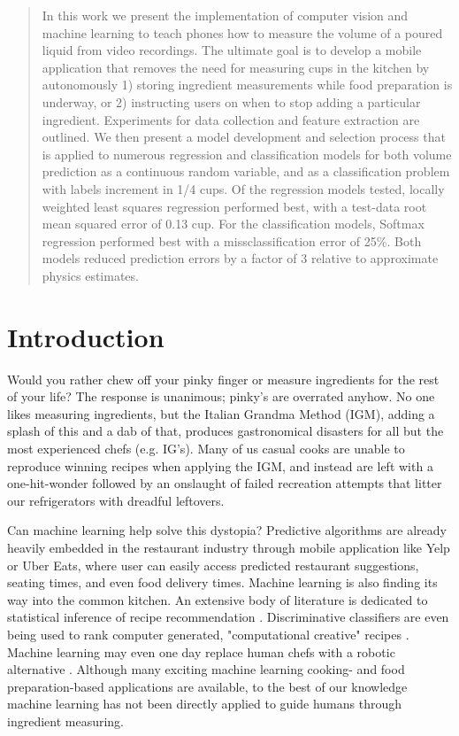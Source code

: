 \documentclass[twocolumn,10pt]{article}
\begin{document}

\begin{abstract}
In this work we present the implementation of computer vision and machine learning to teach phones how to measure the volume of a poured liquid from video recordings. The ultimate goal is to develop a mobile application that removes the need for measuring cups in the kitchen by autonomously 1) storing ingredient measurements while food preparation is underway, or 2) instructing users on when to stop adding a particular ingredient. Experiments for data collection and feature extraction are outlined. We then present a model development and selection process that is applied to numerous regression and classification models for both volume prediction as a continuous random variable, and as a classification problem with labels increment in 1/4 cups. Of the regression models tested, locally weighted least squares regression performed best, with a test-data root mean squared error of 0.13 cup. For the classification models, Softmax regression performed best with a missclassification error of 25\%. Both models reduced prediction errors by a factor of 3 relative to approximate physics estimates.        
\end{abstract}

\section{Introduction}
Would you rather chew off your pinky finger or measure ingredients for the rest of your life? The response is unanimous; pinky's are overrated anyhow. No one likes measuring ingredients, but the Italian Grandma Method (IGM), adding a splash of this and a dab of that, produces gastronomical disasters for all but the most experienced chefs (e.g. IG’s). Many of us casual cooks are unable to reproduce winning recipes when applying the IGM, and instead are left with a one-hit-wonder followed by an onslaught of failed recreation attempts that litter our refrigerators with dreadful leftovers.

Can machine learning help solve this dystopia? Predictive algorithms are already heavily embedded in the restaurant industry through mobile application like Yelp or Uber Eats, where user can easily access predicted restaurant suggestions, seating times, and even food delivery times. Machine learning is also finding its way into the common kitchen. An extensive body of literature is dedicated to statistical inference of recipe recommendation \cite{freyne2010,forbes2011,ueda2011,kamieth2011}. Discriminative classifiers are even being used to rank computer generated, "computational creative" recipes \cite{cromwell2015}. Machine learning may even one day replace human chefs with a robotic alternative \cite{Moley2014}. Although many exciting machine learning cooking- and food preparation-based applications are available, to the best of our knowledge machine learning has not been directly applied to guide humans through ingredient measuring.   
\end{document}
